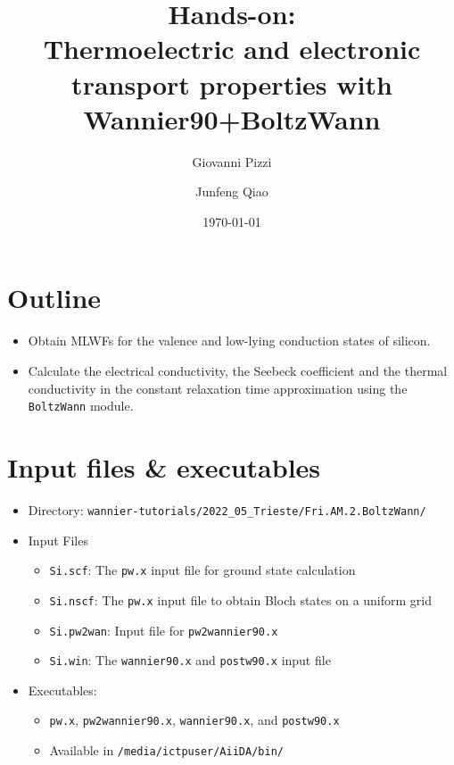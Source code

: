 \documentclass[11pt,a4paper]{article}
\begin{document}

\title{Hands-on:\\
  \textbf{Thermoelectric and electronic transport properties with Wannier90+BoltzWann}}

\author{Giovanni Pizzi}
\author{Junfeng Qiao}

\date{\today}
\maketitle

\newcommand{\wan}{\texttt{Wannier90}\xspace}
\newcommand{\boltzwan}{\texttt{BoltzWann}\xspace}
\newcommand{\pwx}{\texttt{pw.x}\xspace}
\newcommand{\ptowx}{\textnormal{\texttt{pw2wannier90.x}}\xspace}
\newcommand{\wanx}{\textnormal{\texttt{wannier90.x}}\xspace}
\newcommand{\postwanx}{\textnormal{\texttt{postw90.x}}\xspace}

\section{Outline}

\begin{itemize}
  \item Obtain MLWFs for the valence and low-lying conduction states of silicon.
  \item Calculate the electrical conductivity, the Seebeck coefficient and the thermal
        conductivity in the constant relaxation time approximation using the \boltzwan
        module\cite{Pizzi2014,Pizzi2014a}.
\end{itemize}

\section{Input files \& executables}
\begin{itemize}
  \item{Directory: \texttt{wannier-tutorials/2022\_05\_Trieste/Fri.AM.2.BoltzWann/}}
  \item{Input Files}
  \begin{itemize}
    \item \texttt{Si.scf}: The \pwx input file for ground state
          calculation
    \item \texttt{Si.nscf}: The \pwx input file to obtain Bloch
          states on a uniform grid
    \item \texttt{Si.pw2wan}: Input file for \ptowx
    \item \texttt{Si.win}: The \wanx and \postwanx input file
  \end{itemize}
  \item Executables:
        \begin{itemize}
          \item \pwx, \ptowx, \wanx, and \postwanx
          \item Available in \texttt{/media/ictpuser/AiiDA/bin/}
        \end{itemize}
\end{itemize}
\end{document}
